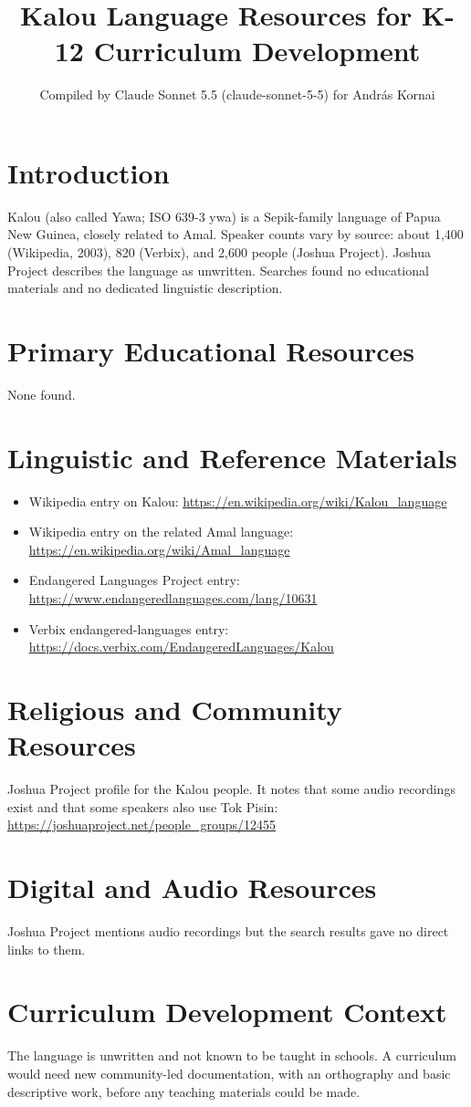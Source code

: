 \documentclass[12pt]{article}
\title{Kalou Language Resources for K-12 Curriculum Development}
\author{Compiled by Claude Sonnet 5.5 (claude-sonnet-5-5) for Andr\'as Kornai}
\date{}
\begin{document}
\maketitle

\section{Introduction}
Kalou (also called Yawa; ISO 639-3 ywa) is a Sepik-family language of Papua New Guinea, closely related to Amal. Speaker counts vary by source: about 1,400 (Wikipedia, 2003), 820 (Verbix), and 2,600 people (Joshua Project). Joshua Project describes the language as unwritten. Searches found no educational materials and no dedicated linguistic description.

\section{Primary Educational Resources}
None found.

\section{Linguistic and Reference Materials}
\begin{itemize}
\item Wikipedia entry on Kalou: \url{https://en.wikipedia.org/wiki/Kalou_language}
\item Wikipedia entry on the related Amal language: \url{https://en.wikipedia.org/wiki/Amal_language}
\item Endangered Languages Project entry: \url{https://www.endangeredlanguages.com/lang/10631}
\item Verbix endangered-languages entry: \url{https://docs.verbix.com/EndangeredLanguages/Kalou}
\end{itemize}

\section{Religious and Community Resources}
Joshua Project profile for the Kalou people. It notes that some audio recordings exist and that some speakers also use Tok Pisin: \url{https://joshuaproject.net/people_groups/12455}

\section{Digital and Audio Resources}
Joshua Project mentions audio recordings but the search results gave no direct links to them.

\section{Curriculum Development Context}
The language is unwritten and not known to be taught in schools. A curriculum would need new community-led documentation, with an orthography and basic descriptive work, before any teaching materials could be made.
\end{document}

